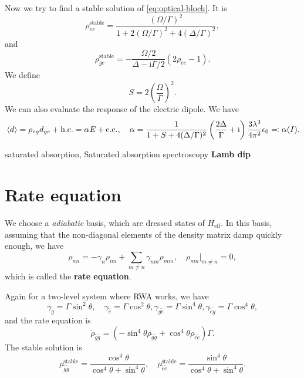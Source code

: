 \documentclass[hyperref, a4paper]{article}
\newcommand*{\ii}{\mathrm{i}}
\newcommand*{\concept}[1]{{\textbf{#1}}}
\begin{document}
Now we try to find a stable solution of \eqref{eq:optical-bloch}. It is 
\begin{equation}
    \rho_{ee}^\text{stable} = \frac{(\Omega / \Gamma)^2 }{1 + 2 (\Omega / \Gamma)^2 + 4 (\Delta / \Gamma)^2},
\end{equation}
and 
\begin{equation}
    \rho_{ge}^\text{stable} = - \frac{\Omega / 2}{\Delta - \ii \Gamma / 2} (2 \rho_{ee} - 1).
\end{equation}
We define 
\begin{equation}
    S = 2 \left(\frac{\Omega}{\Gamma}\right)^2.
\end{equation}
We can also evaluate the response of the electric dipole. We have 
\begin{equation}
    \expval*{d} = \rho_{eg} d_{ge} + \text{h.c.} = \alpha E + \text{c.c.},
    \quad \alpha = \frac{1}{1 + S + 4 (\Delta / \Gamma)^2 } \left( \frac{2 \Delta}{\Gamma} + \ii \right) 
    \frac{3 \lambda^3}{4 \pi^2} \epsilon_0 \eqqcolon \alpha(I).
\end{equation}

saturated absorption, Saturated absorption spectroscopy 
\concept{Lamb dip} 

\section{Rate equation} 

We choose a \emph{adiabatic} basis, which are dressed states of $H_\text{eff}$. In this basis, assuming that 
the non-diagonal elements of the density matrix damp quickly enough, we have 
\begin{equation}
    \dot{\rho}_{nn} = - \gamma_{n} \rho_{nn} + \sum_{m \neq n} \gamma_{nm} \rho_{mm}, \quad \rho_{mn}|_{m \neq n} = 0,
\end{equation} 
which is called the \concept{rate equation}. 

Again for a two-level system where RWA works, we have 
\begin{equation}
    \gamma_{\tilde{g}} = \Gamma \sin^2 \theta , \quad \gamma_{\tilde{e}} = \Gamma \cos^2 \theta,
    \gamma_{\tilde{g} \tilde{e}} = \Gamma \sin^4 \theta , \gamma_{\tilde{e} \tilde{g}} = \Gamma \cos^4 \theta,
\end{equation}
and the rate equation is 
\begin{equation}
    \dot{\rho}_{\tilde{g} \tilde{g}} = (- \sin^4 \theta \rho_{\tilde{g} \tilde{g}} + \cos^4 \theta \rho_{\tilde{e} \tilde{e}})  \Gamma.
\end{equation}
The stable solution is 
\begin{equation}
    \rho^\text{stable}_{\tilde{g} \tilde{g}} = \frac{\cos^4 \theta}{\cos^4 \theta + \sin^4 \theta}, \quad 
    \rho^\text{stable}_{\tilde{e} \tilde{e}} = \frac{\sin^4 \theta}{\cos^4 \theta + \sin^4 \theta}.
\end{equation}
\end{document}
